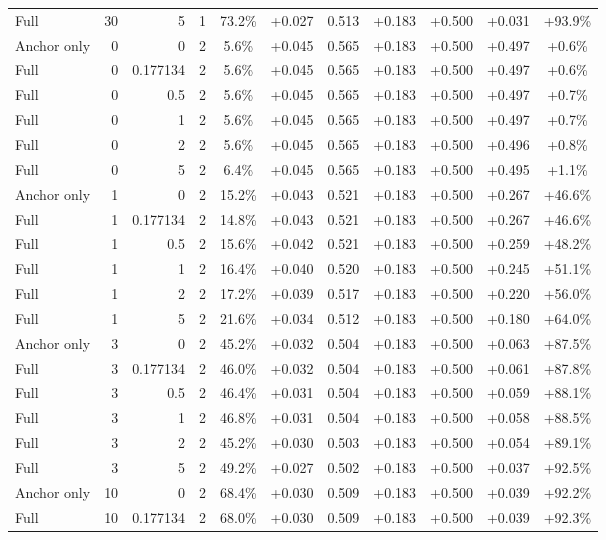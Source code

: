 \begin{table}[htbp]
\begin{tabular}{lrrrccccccc}
Full & 30 & 5 & 1 & 73.2\% & +0.027 & 0.513 & +0.183 & +0.500 & +0.031 & +93.9\% \\
Anchor only & 0 & 0 & 2 & 5.6\% & +0.045 & 0.565 & +0.183 & +0.500 & +0.497 & +0.6\% \\
Full & 0 & 0.177134 & 2 & 5.6\% & +0.045 & 0.565 & +0.183 & +0.500 & +0.497 & +0.6\% \\
Full & 0 & 0.5 & 2 & 5.6\% & +0.045 & 0.565 & +0.183 & +0.500 & +0.497 & +0.7\% \\
Full & 0 & 1 & 2 & 5.6\% & +0.045 & 0.565 & +0.183 & +0.500 & +0.497 & +0.7\% \\
Full & 0 & 2 & 2 & 5.6\% & +0.045 & 0.565 & +0.183 & +0.500 & +0.496 & +0.8\% \\
Full & 0 & 5 & 2 & 6.4\% & +0.045 & 0.565 & +0.183 & +0.500 & +0.495 & +1.1\% \\
Anchor only & 1 & 0 & 2 & 15.2\% & +0.043 & 0.521 & +0.183 & +0.500 & +0.267 & +46.6\% \\
Full & 1 & 0.177134 & 2 & 14.8\% & +0.043 & 0.521 & +0.183 & +0.500 & +0.267 & +46.6\% \\
Full & 1 & 0.5 & 2 & 15.6\% & +0.042 & 0.521 & +0.183 & +0.500 & +0.259 & +48.2\% \\
Full & 1 & 1 & 2 & 16.4\% & +0.040 & 0.520 & +0.183 & +0.500 & +0.245 & +51.1\% \\
Full & 1 & 2 & 2 & 17.2\% & +0.039 & 0.517 & +0.183 & +0.500 & +0.220 & +56.0\% \\
Full & 1 & 5 & 2 & 21.6\% & +0.034 & 0.512 & +0.183 & +0.500 & +0.180 & +64.0\% \\
Anchor only & 3 & 0 & 2 & 45.2\% & +0.032 & 0.504 & +0.183 & +0.500 & +0.063 & +87.5\% \\
Full & 3 & 0.177134 & 2 & 46.0\% & +0.032 & 0.504 & +0.183 & +0.500 & +0.061 & +87.8\% \\
Full & 3 & 0.5 & 2 & 46.4\% & +0.031 & 0.504 & +0.183 & +0.500 & +0.059 & +88.1\% \\
Full & 3 & 1 & 2 & 46.8\% & +0.031 & 0.504 & +0.183 & +0.500 & +0.058 & +88.5\% \\
Full & 3 & 2 & 2 & 45.2\% & +0.030 & 0.503 & +0.183 & +0.500 & +0.054 & +89.1\% \\
Full & 3 & 5 & 2 & 49.2\% & +0.027 & 0.502 & +0.183 & +0.500 & +0.037 & +92.5\% \\
Anchor only & 10 & 0 & 2 & 68.4\% & +0.030 & 0.509 & +0.183 & +0.500 & +0.039 & +92.2\% \\
Full & 10 & 0.177134 & 2 & 68.0\% & +0.030 & 0.509 & +0.183 & +0.500 & +0.039 & +92.3\% \\

\end{tabular}
\end{table}
